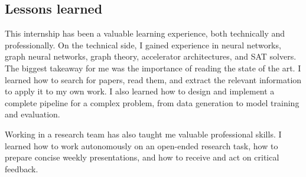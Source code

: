 %
%

\subsection{Lessons learned}

This internship has been a valuable learning experience, both technically and professionally. On the technical side, I gained experience in neural networks, graph neural networks, graph theory, accelerator architectures, and SAT solvers. The biggest takeaway for me was the importance of reading the state of the art. I learned how to search for papers, read them, and extract the relevant information to apply it to my own work. I also learned how to design and implement a complete pipeline for a complex problem, from data generation to model training and evaluation.

Working in a research team has also taught me valuable professional skills. I learned how to work autonomously on an open-ended research task, how to prepare concise weekly presentations, and how to receive and act on critical feedback.

%

